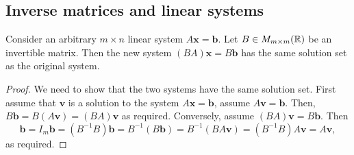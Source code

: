 \documentclass[10pt, a4paper]{article}
\newcommand{\mbf}[1]{\mathbf{#1}}
\begin{document}
\subsection{Inverse matrices and linear systems}
\begin{lemma}\label{linalg_lem_solsetsam}
    Consider an arbitrary $m \times n$ linear system $A\mbf{x} = \mbf{b}$.
    Let $B \in M_{m \times m}(\mathbb{R})$ be an invertible matrix.
    Then the new system $(BA)\mbf{x} = B\mbf{b}$ has the same solution set as the original system.
    \begin{proof}
        We need to show that the two systems have the same solution set.
        First assume that $\mbf{v}$ is a solution to the system $A\mbf{x} = \mbf{b}$, assume $A\mbf{v} = \mbf{b}$.
        Then, $B\mbf{b} = B(A\mbf{v}) = (BA)\mbf{v}$ as required.
        Conversely, assume $(BA)\mbf{v} = B\mbf{b}$. Then
        \[
        \mbf{b} = I_m\mbf{b} = (B ^ {-1}B)\mbf{b} = B ^ {-1}(B\mbf{b}) = B ^ {-1}(BA\mbf{v}) = (B ^ {-1} B) A\mbf{v} = A\mbf{v},
        \]
        as required.
    \end{proof}
\end{lemma}
\end{document}
